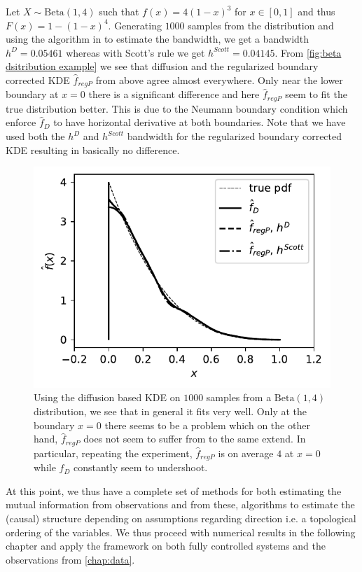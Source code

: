 \documentclass[../Thesis.tex]{subfiles}
\begin{document}
\begin{example}
    Let $X\sim \text{Beta} \left(1,4\right)$ such that $f(x) = 4 \left(1- x\right)^3$ for $x\in \left[0,1\right]$ and thus $F\left(x\right) = 1 - (1-x)^4$. Generating $1000$ samples from the distribution and using the algorithm in \cite{Kernel-density-estimation-via-diffusion} to estimate the bandwidth, we get a bandwidth $h^D = 0.05461$ whereas with Scott's rule we get $h ^{Scott} = 0.04145$. From \autoref{fig:beta dsitribution example} we see that diffusion and the regularized boundary corrected KDE $\hat{f}_{regP}$ from above agree almost everywhere. Only near the lower boundary at $x=0$ there is a significant difference and here $\hat{f}_{regP}$ seem to fit the true distribution better. This is due to the Neumann boundary condition which enforce $\hat{f}_D$ to have horizontal derivative at both boundaries. Note that we have used both the $h^D$ and $h^{Scott}$ bandwidth for the regularized boundary corrected KDE resulting in basically no difference.

    \begin{figure}[ht]
        \centering
        \includegraphics[width = .7\linewidth]{figures/MI estimation/beta dist example - comparison with diffusion and jones.pdf}
        \caption{Using the diffusion based KDE on $1000$ samples from a $\text{Beta}\left(1,4\right)$ distribution, we see that in general it fits very well. Only at the boundary $x=0$ there seems to be a problem which on the other hand, $\hat{f}_{regP}$ does not seem to suffer from to the same extend. In particular, repeating the experiment, $\hat{f}_{regP}$ is on average $4$ at $x = 0$ while $\hat{f}_{D}$ constantly seem to undershoot.}
        \label{fig:beta dsitribution example}
    \end{figure}
\end{example}
At this point, we thus have a complete set of methods for both estimating the mutual information from observations and from these, algorithms to estimate the (causal) structure depending on assumptions regarding direction i.e. a topological ordering of the variables. We thus proceed with numerical results in the following chapter and apply the framework on both fully controlled systems and the observations from \autoref{chap:data}.
\end{document}
